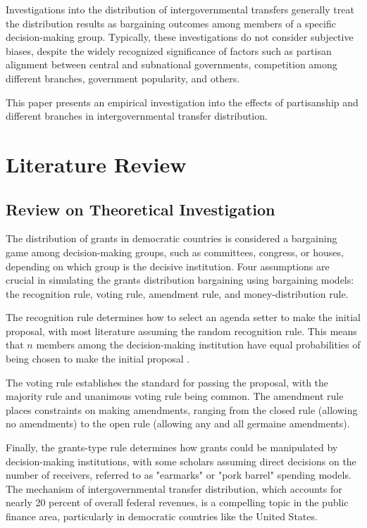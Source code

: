 \documentclass[man]{apa7}
\begin{document}
Investigations into the distribution of intergovernmental transfers generally treat the distribution results as bargaining outcomes among members of a specific decision-making group. Typically, these investigations do not consider subjective biases, despite the widely recognized significance of factors such as partisan alignment between central and subnational governments, competition among different branches, government popularity, and others\parencite{tellier2006public,petry1999electoral,balla2002partisanship,bickers2000congressional}.

This paper presents an empirical investigation into the effects of partisanship and different branches in intergovernmental transfer distribution.

\section{Literature Review}
\subsection{Review on Theoretical Investigation}

The distribution of grants in democratic countries is considered a bargaining game among decision-making groups, such as committees, congress, or houses, depending on which group is the decisive institution. Four assumptions are crucial in simulating the grants distribution bargaining using bargaining models: the recognition rule, voting rule, amendment rule, and money-distribution rule.

The recognition rule determines how to select an agenda setter to make the initial proposal, with most literature assuming the random recognition rule. This means that $n$ members among the decision-making institution have equal probabilities of being chosen to make the initial proposal \parencite{kalandrakis2004three,anesi2015bargaining,diermeier2011legislative,rosenstiel2021congressional}.

The voting rule establishes the standard for passing the proposal, with the majority rule and unanimous voting rule being common. The amendment rule places constraints on making amendments, ranging from the closed rule (allowing no amendments) to the open rule (allowing any and all germaine amendments).

Finally, the grants-type rule determines how grants could be manipulated by decision-making institutions, with some scholars assuming direct decisions on the number of receivers, referred to as "earmarks" or "pork barrel" spending models. The mechanism of intergovernmental transfer distribution, which accounts for nearly 20 percent of overall federal revenues, is a compelling topic in the public finance area, particularly in democratic countries like the United States.%
\end{document}
